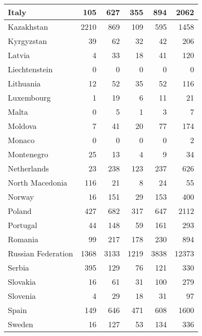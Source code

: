 \begin{table}
\begin{center}
\begin{tabular}{|l|r|r|r|r|r|}
                         Italy&   105&   627&   355&   894&  2062 \\\hline
                    Kazakhstan&  2210&   869&   109&   595&  1458 \\\hline
                    Kyrgyzstan&    39&    62&    32&    42&   206 \\\hline
                        Latvia&     4&    33&    18&    41&   120 \\\hline
                 Liechtenstein&     0&     0&     0&     0&     0 \\\hline
                     Lithuania&    12&    52&    35&    52&   116 \\\hline
                    Luxembourg&     1&    19&     6&    11&    21 \\\hline
                         Malta&     0&     5&     1&     3&     7 \\\hline
                       Moldova&     7&    41&    20&    77&   174 \\\hline
                        Monaco&     0&     0&     0&     0&     2 \\\hline
                    Montenegro&    25&    13&     4&     9&    34 \\\hline
                   Netherlands&    23&   238&   123&   237&   626 \\\hline
               North Macedonia&   116&    21&     8&    24&    55 \\\hline
                        Norway&    16&   151&    29&   153&   400 \\\hline
                        Poland&   427&   682&   317&   647&  2112 \\\hline
                      Portugal&    44&   148&    59&   161&   293 \\\hline
                       Romania&    99&   217&   178&   230&   894 \\\hline
            Russian Federation&  1368&  3133&  1219&  3838& 12373 \\\hline
                        Serbia&   395&   129&    76&   121&   330 \\\hline
                      Slovakia&    16&    61&    31&   100&   279 \\\hline
                      Slovenia&     4&    29&    18&    31&    97 \\\hline
                         Spain&   149&   646&   471&   608&  1600 \\\hline
                        Sweden&    16&   127&    53&   134&   336 \\\hline

\end{tabular}
\end{center}
\end{table}
